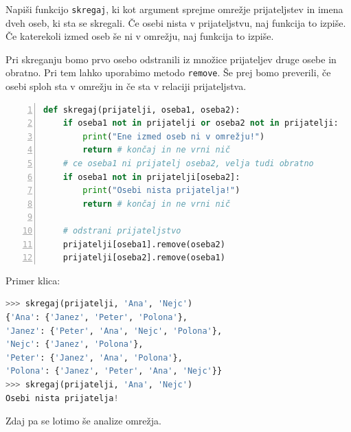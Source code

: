 \begin{zgled}
Napiši funkcijo \texttt{skregaj}, ki kot argument sprejme omrežje prijateljstev in imena dveh oseb, ki sta se skregali. Če osebi nista v prijateljstvu, naj funkcija to izpiše. Če katerekoli izmed oseb še ni v omrežju, naj funkcija to izpiše. 
\end{zgled}
\begin{resitev}
Pri skreganju bomo prvo osebo odstranili iz množice prijateljev druge osebe in obratno. Pri tem lahko uporabimo metodo \texttt{remove}. Še prej bomo preverili, če osebi sploh sta v omrežju in če sta v relaciji prijateljstva.
\begin{lstlisting}[language=Python, showstringspaces=false,numbers=left]
def skregaj(prijatelji, oseba1, oseba2):
    if oseba1 not in prijatelji or oseba2 not in prijatelji:
        print("Ene izmed oseb ni v omrežju!")
        return # končaj in ne vrni nič
    # ce oseba1 ni prijatelj oseba2, velja tudi obratno
    if oseba1 not in prijatelji[oseba2]:    
        print("Osebi nista prijatelja!")
        return # končaj in ne vrni nič
    
    # odstrani prijateljstvo
    prijatelji[oseba1].remove(oseba2)
    prijatelji[oseba2].remove(oseba1)
\end{lstlisting}
Primer klica:
\begin{lstlisting}[language=Python, showstringspaces=false]
>>> skregaj(prijatelji, 'Ana', 'Nejc')
{'Ana': {'Janez', 'Peter', 'Polona'}, 
'Janez': {'Peter', 'Ana', 'Nejc', 'Polona'}, 
'Nejc': {'Janez', 'Polona'}, 
'Peter': {'Janez', 'Ana', 'Polona'}, 
'Polona': {'Janez', 'Peter', 'Ana', 'Nejc'}}
>>> skregaj(prijatelji, 'Ana', 'Nejc')
Osebi nista prijatelja!
\end{lstlisting}
\end{resitev}

Zdaj pa se lotimo še analize omrežja.

